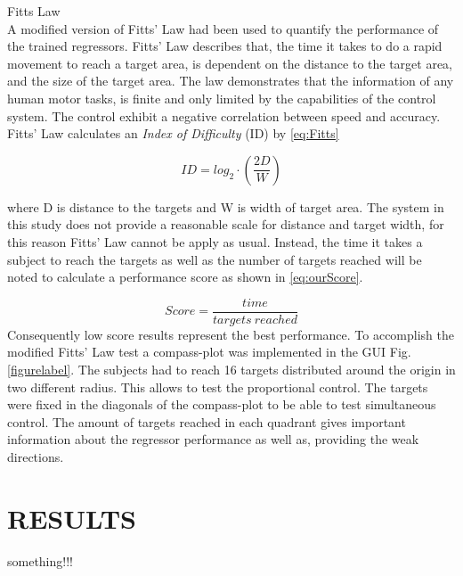 \documentclass[a4paper, 10pt, conference]{ieeeconf}      %
\begin{document}
	Fitts Law\\
	A modified version of Fitts' Law had been used to quantify the performance of the trained regressors. Fitts' Law describes that, the time it takes to do a rapid movement to reach a target area, is dependent on the distance to the target area, and the size of the target area. The law demonstrates that the information of any human motor tasks, is finite and only limited by the capabilities of the control system. The control exhibit a negative correlation between speed and accuracy. \cite{Kamavuako2014}
	Fitts' Law calculates an \textit{Index of Difficulty} (ID) by \ref{eq:Fitts}
	
	\begin{equation} \label{eq:Fitts}
	ID = log_{2} \cdot (\frac{2D}{W})
	\end{equation}
	
	where D is distance to the targets and W is width of target area. The system in this study does not provide a reasonable scale for distance and target width, for this reason Fitts' Law cannot be apply as usual. Instead, the time it takes a subject to reach the targets as well as the number of targets reached will be noted to calculate a performance score as shown in \ref{eq:ourScore}.
	
	\begin{equation} \label{eq:ourScore}
	Score = \frac{time}{targets\ reached}
	\end{equation}
	Consequently low score results represent the best performance.
	To accomplish the modified Fitts' Law test a compass-plot was implemented in the GUI Fig.\ref{figurelabel}. The subjects had to reach 16 targets distributed around the origin in two different radius. This allows to test the proportional control. The targets were fixed in the diagonals of the compass-plot to be able to test simultaneous control. The amount of targets reached in each quadrant gives important information about the regressor performance as well as, providing the weak directions.
	

	
	\section{RESULTS}
	
	something!!! 
	
\end{document}
